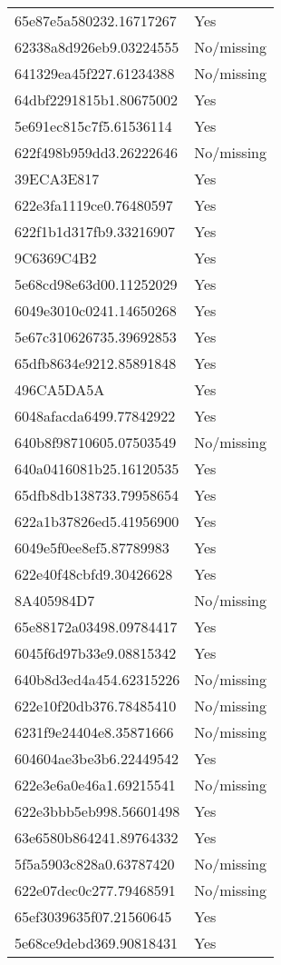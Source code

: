 \begin{tabular}{ll}
65e87e5a580232.16717267 & Yes \\
62338a8d926eb9.03224555 & No/missing \\
641329ea45f227.61234388 & No/missing \\
64dbf2291815b1.80675002 & Yes \\
5e691ec815c7f5.61536114 & Yes \\
622f498b959dd3.26222646 & No/missing \\
39ECA3E817 & Yes \\
622e3fa1119ce0.76480597 & Yes \\
622f1b1d317fb9.33216907 & Yes \\
9C6369C4B2 & Yes \\
5e68cd98e63d00.11252029 & Yes \\
6049e3010c0241.14650268 & Yes \\
5e67c310626735.39692853 & Yes \\
65dfb8634e9212.85891848 & Yes \\
496CA5DA5A & Yes \\
6048afacda6499.77842922 & Yes \\
640b8f98710605.07503549 & No/missing \\
640a0416081b25.16120535 & Yes \\
65dfb8db138733.79958654 & Yes \\
622a1b37826ed5.41956900 & Yes \\
6049e5f0ee8ef5.87789983 & Yes \\
622e40f48cbfd9.30426628 & Yes \\
8A405984D7 & No/missing \\
65e88172a03498.09784417 & Yes \\
6045f6d97b33e9.08815342 & Yes \\
640b8d3ed4a454.62315226 & No/missing \\
622e10f20db376.78485410 & No/missing \\
6231f9e24404e8.35871666 & No/missing \\
604604ae3be3b6.22449542 & Yes \\
622e3e6a0e46a1.69215541 & No/missing \\
622e3bbb5eb998.56601498 & Yes \\
63e6580b864241.89764332 & Yes \\
5f5a5903c828a0.63787420 & No/missing \\
622e07dec0c277.79468591 & No/missing \\
65ef3039635f07.21560645 & Yes \\
5e68ce9debd369.90818431 & Yes \\

\end{tabular}
